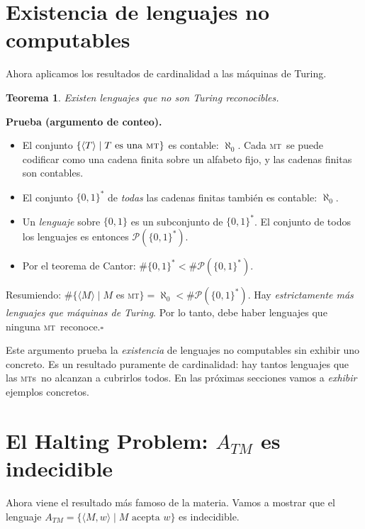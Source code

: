 \documentclass[11pt,a4paper]{article}
\theoremstyle{definicion}
\newtheorem{teorema}[definicion]{Teorema}
\newcommand{\MT}{\textsc{mt}}
\newcommand{\MTs}{\textsc{mt}s}
\newcommand{\enc}[1]{\langle #1 \rangle}
\begin{document}
\section{Existencia de lenguajes no computables}

Ahora aplicamos los resultados de cardinalidad a las máquinas de Turing.

\begin{teorema}
Existen lenguajes que no son Turing reconocibles.
\end{teorema}

\textbf{Prueba (argumento de conteo).}
\begin{itemize}
    \item El conjunto $\{\enc{T} \mid T \text{ es una \MT}\}$ es contable: $\aleph_0$. Cada \MT\ se puede codificar como una cadena finita sobre un alfabeto fijo, y las cadenas finitas son contables.
    \item El conjunto $\{0, 1\}^*$ de \emph{todas} las cadenas finitas también es contable: $\aleph_0$.
    \item Un \emph{lenguaje} sobre $\{0, 1\}$ es un subconjunto de $\{0, 1\}^*$. El conjunto de todos los lenguajes es entonces $\mathcal{P}(\{0,1\}^*)$.
    \item Por el teorema de Cantor: $\#\{0,1\}^* < \#\mathcal{P}(\{0,1\}^*)$.
\end{itemize}

Resumiendo: $\#\{\enc{M} \mid M$ es \MT$\} = \aleph_0 < \#\mathcal{P}(\{0,1\}^*)$. Hay \emph{estrictamente más lenguajes que máquinas de Turing}. Por lo tanto, debe haber lenguajes que ninguna \MT\ reconoce.\hfill$\square$

\begin{idea}
Este argumento prueba la \emph{existencia} de lenguajes no computables sin exhibir uno concreto. Es un resultado puramente de cardinalidad: hay tantos lenguajes que las \MTs\ no alcanzan a cubrirlos todos. En las próximas secciones vamos a \emph{exhibir} ejemplos concretos.
\end{idea}

\section{El Halting Problem: \texorpdfstring{$A_{TM}$}{ATM} es indecidible}

Ahora viene el resultado más famoso de la materia. Vamos a mostrar que el lenguaje $A_{TM} = \{ \enc{M, w} \mid M \text{ acepta } w\}$ es indecidible.
\end{document}
